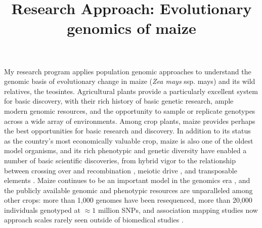 \documentclass[11pt,letterpaper]{article}
\begin{document}
\title{\vspace{-5ex}Research Approach: Evolutionary genomics of maize\vspace{-4ex}}
\author{}
\date{}
\maketitle




My research program applies population genomic approaches to understand the genomic basis of evolutionary change in maize (\emph{Zea mays} ssp. {mays}) and its wild relatives, the teosintes.  
Agricultural plants provide a particularly excellent system for basic discovery, with their rich history of basic genetic research, ample modern genomic resources, and the opportunity to sample or replicate genotypes across a wide array of environments.
Among crop plants, maize provides perhaps the best opportunities for basic research and discovery.
In addition to its status as the country's most economically valuable crop, maize is also one of the oldest model organisms, and its rich phenotypic and genetic diversity have enabled a number of basic scientific discoveries, from hybrid vigor \citep{shull1908composition} to the relationship between crossing over and recombination \citep{creighton1931correlation}, meiotic drive \citep{rhoades1942preferential}, and transposable elements \citep{mcclintock1950origin}. 
Maize continues to be an important model in the genomics era \citep{nannas2015genetic}, and the publicly available genomic and phenotypic resources are unparalleled among other crops: more than 1,000 genomes have been resequenced, more than 20,000 individuals genotyped at $\approx 1$ million SNPs, and association mapping studies now approach scales rarely seen outside of biomedical studies \citep[e.g. 65,000 plots in][]{peiffer2014genetic}.\
\end{document}
